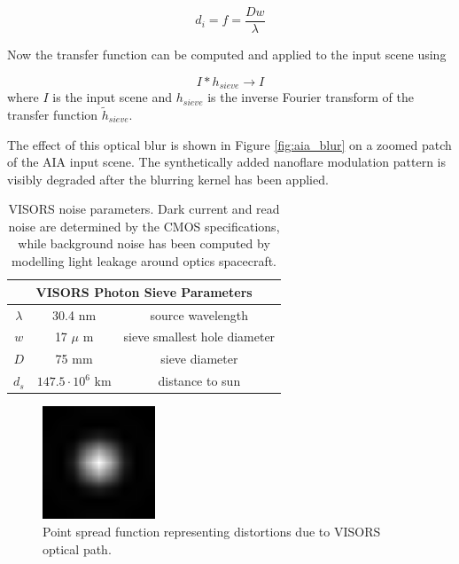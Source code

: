 \documentclass[tocnosub,noragright,centerchapter,12pt]{uiucecethesis09}
\begin{document}
$$d_i = f = \frac{Dw}{\lambda}$$

Now the transfer function can be computed and applied to the input scene using

$$I \ast h_{sieve} \rightarrow I$$
where $I$ is the input scene and $h_{sieve}$ is the inverse Fourier transform of the transfer function $\tilde{h}_{sieve}$.

The effect of this optical blur is shown in Figure \ref{fig:aia_blur} on a zoomed patch of the AIA input scene.  The synthetically added nanoflare modulation pattern is visibly degraded after the blurring kernel has been applied.

\begin{table}
  \begin{center}
    \begin{tabular}{|c|c|c|}
      \hline
      \multicolumn{3}{|c|}{VISORS Photon Sieve Parameters} \\
      \hline
      $\lambda$ & 30.4 nm & source wavelength \\
      $w$ & 17 $\mu$ m & sieve smallest hole diameter \\
      $D$ & 75 mm  & sieve diameter \\
      $d_s$ & $147.5 \cdot 10^6$ km  & distance to sun \\
      \hline
    \end{tabular}
    \caption{VISORS noise parameters.  Dark current and read noise are determined by the CMOS specifications, while background noise has been computed by modelling light leakage around optics spacecraft.}
    \label{tab:sieve_params}
  \end{center}
\end{table}

\begin{figure}
  \centering
  \includegraphics[width=0.3\textwidth]{figures/psf.png}
  \caption{Point spread function representing distortions due to VISORS optical path.}
  \label{fig:psf}
\end{figure}
\end{document}
